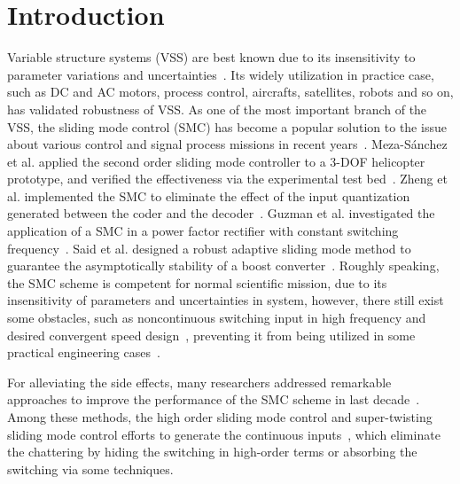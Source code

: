 \documentclass[3p]{elsarticle}
\theoremstyle{plain}
\theoremstyle{remark}
\begin{document}
\section{Introduction}
Variable structure systems (VSS) are best known due to its insensitivity to parameter variations and uncertainties~\cite{slotine1991applied}. Its widely utilization in practice case, such as DC and AC motors, process control, aircrafts, satellites, robots and so on, has validated robustness of VSS. As one of the most important branch of the VSS, the sliding mode control (SMC) has become a popular solution to the issue about various control and signal process missions in recent years~\cite{zhao2015nonlinear,zhang2015attitude}. Meza-S{\'a}nchez et al. applied the second order sliding mode controller to a 3-DOF helicopter prototype, and verified the effectiveness via the experimental test bed~\cite{meza2015output}. Zheng et al. implemented the SMC to eliminate the effect of the input quantization generated between the coder and the decoder~\cite{zheng2016sliding}. Guzman et al. investigated the application of a SMC in a power factor rectifier with constant switching frequency~\cite{guzman2016sliding}. Said et al. designed a robust adaptive sliding mode method to guarantee the asymptotically stability of a boost converter~\cite{oucheriah2013pwm}. Roughly speaking, the SMC scheme is competent for normal scientific mission, due to its insensitivity of parameters and uncertainties in system, however, there still exist some obstacles, such as noncontinuous switching input in high frequency and desired convergent speed design~\cite{boiko2013chattering,lee2009chattering}, preventing it from being utilized in some practical engineering cases~\cite{fridman2011sliding}. \par
For alleviating the side effects, many researchers addressed remarkable approaches to improve the performance of the SMC scheme in last decade~\cite{zong2013quasi,santiesteban2013time,mu2015continuous,evangelista2013lyapunov,gonzalez2014chattering,dadras2012fractional,zhao2013output}. Among these methods, the high order sliding mode control and super-twisting sliding mode control efforts to generate the continuous inputs~\cite{castillo2015higher,palosz2015laser,edwards2016adaptive,zhao2015finite,liu2015second}, which eliminate the chattering by hiding the switching in high-order terms or absorbing the switching via some techniques. \par
\end{document}
